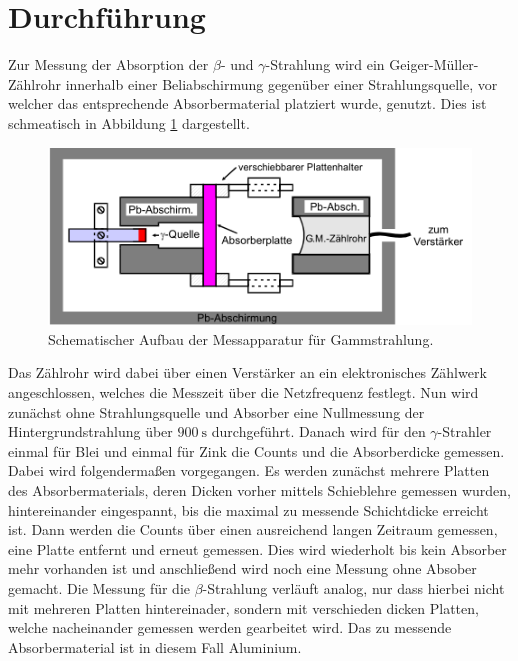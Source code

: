 \section{Durchführung}
\label{sec:Durchführung}
Zur Messung der Absorption der $\beta$- und $\gamma$-Strahlung wird ein Geiger-Müller-Zählrohr innerhalb einer Beliabschirmung gegenüber einer Strahlungsquelle, vor
welcher das entsprechende Absorbermaterial platziert wurde, genutzt. Dies ist schmeatisch in Abbildung \ref{fig:Aufbau} dargestellt.
\begin{figure}
  \centering
  \includegraphics{pictures/Aufbau.png}
  \caption{Schematischer Aufbau der Messapparatur für Gammstrahlung.\cite{sample}}
  \label{fig:Aufbau}
\end{figure}
Das Zählrohr wird dabei über einen Verstärker an ein elektronisches Zählwerk angeschlossen, welches die Messzeit über die Netzfrequenz festlegt.
Nun wird zunächst ohne Strahlungsquelle und Absorber eine Nullmessung der Hintergrundstrahlung über $\SI{900}{\second}$ durchgeführt.
Danach wird für den $\gamma$-Strahler einmal für Blei und einmal für Zink die Counts und die Absorberdicke gemessen.
Dabei wird folgendermaßen vorgegangen. Es werden zunächst mehrere Platten des Absorbermaterials, deren Dicken vorher mittels Schieblehre gemessen wurden,
hintereinander eingespannt, bis die maximal zu messende Schichtdicke erreicht ist. Dann werden die Counts über einen ausreichend langen Zeitraum gemessen, eine Platte
entfernt und erneut gemessen. Dies wird wiederholt bis kein Absorber mehr vorhanden ist und anschließend wird noch eine Messung ohne Absober gemacht.
Die Messung für die $\beta$-Strahlung verläuft analog, nur dass hierbei nicht mit mehreren Platten hintereinader, sondern mit verschieden dicken Platten, welche
nacheinander gemessen werden gearbeitet wird. Das zu messende Absorbermaterial ist in diesem Fall Aluminium.
